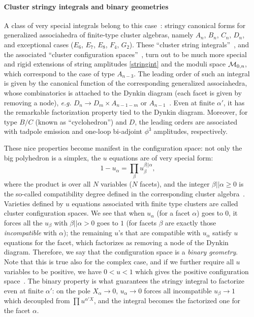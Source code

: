 \documentclass[hidelinks,12pt]{article}
\begin{document}
\paragraph{Cluster stringy integrals and binary geometries} A class of very special integrals belong to this case~\cite{Arkani-Hamed:2019plo}: stringy canonical forms for generalized associahedra of finite-type cluster algebras, namely $A_n$, $B_n$, $C_n$, $D_n$, and exceptional cases ($E_6$, $E_7$, $E_8$, $F_4$, $G_2$). These ``cluster string integrals''~\cite{Arkani-Hamed:2019plo}, and the associated ``cluster configuration spaces''~\cite{Arkani-Hamed:2019plo,Arkani-Hamed:tobeappear}, turn out to be much more special and rigid extensions of string amplitudes \eqref{stringint} and the moduli space ${\cal M}_{0,n}$, which correspond to the case of type $A_{n{-}3}$. The leading order of such an integral is given by the canonical function of the corresponding generalized associahedra, whose combinatorics is attached to the Dynkin diagram (each facet is given by removing a node), {\it e.g.} $D_n \to D_m \times A_{n{-}1{-}m}$ or $A_{n{-}1}$~\cite{Arkani-Hamed:2019plo}. Even at finite $\alpha'$, it has the remarkable factorization property tied to the Dynkin diagram. Moreover, for type $B/C$ (known as ``cyclohedron'') and $D$, the leading orders are associated with tadpole emission and one-loop bi-adjoint $\phi^3$ amplitudes, respectively.

These nice properties become manifest in the configuration space: not only the big polyhedron is a simplex, the $u$ equations are of very special form:
\begin{equation}\label{perfectu}
	1-u_\alpha=\prod_{\beta} u_\beta^{\beta||\alpha},
\end{equation}
where the product is over all $N$ variables ($N$ facets), and the integer $\beta || \alpha\geq 0$ is the so-called compatibility degree defined in the corresponding cluster algebra~\cite{Zelevinskysys}. Varieties defined by $u$ equations associated with finite type clusters  are called cluster configuration spaces.
We see that when $u_\alpha$ (for a facet $\alpha$) goes to $0$, it forces all the $u_\beta$ with $\beta || \alpha>0$ goes to $1$ (for facets $\beta$ are exactly those {\it incompatible} with $\alpha$); the remaining $u$'s that are compatible with $u_\alpha$ satisfy $u$ equations for the facet, which factorizes as removing a node of the Dynkin diagram. Therefore, we say that the configuration space is a {\it binary geometry}. Note that this is true also for the complex case, and if we further require all $u$ variables to be positive, we have $0<u<1$ which gives the positive configuration space~\cite{Arkani-Hamed:2020cig}. The binary property is what guarantees the stringy integral to factorize even at finite $\alpha'$: on the pole $X_\alpha \to 0$, $u_\alpha\to 0$ forces all incompatible $u_\beta\to 1$ which decoupled from $\prod u^{\alpha' X}$, and the integral becomes the factorized one for the facet $\alpha$. 
\end{document}
